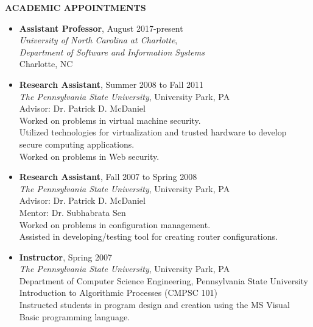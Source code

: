 \documentclass[10pt]{article}
\begin{document}
\vspace{1em} {\Large \textbf{ACADEMIC APPOINTMENTS}}
\begin{itemize}
\item \textbf{Assistant Professor}, August 2017-present\\
  \textit{University of North Carolina at Charlotte},\\
  \textit{Department of Software and Information Systems}\\
  Charlotte, NC\\

\item \textbf{Research Assistant}, Summer 2008 to Fall 2011\\
  \textit{The Pennsylvania State University},
  University Park, PA\\
  Advisor: Dr. Patrick D. McDaniel\\
  Worked on problems in virtual machine security.\\
  Utilized technologies for virtualization and trusted hardware to develop secure computing applications.\\
  Worked on problems in Web security.

\item \textbf{Research Assistant}, Fall 2007 to Spring 2008\\
  \textit{The Pennsylvania State University},
  University Park, PA\\
  Advisor: Dr. Patrick D. McDaniel\\
  Mentor: Dr. Subhabrata Sen\\
  Worked on problems in configuration management.\\
  Assisted in developing/testing tool for creating router configurations.

\item \textbf{Instructor}, Spring 2007\\
  \textit{The Pennsylvania State University},
  University Park, PA\\
  Department of Computer Science Engineering, Pennsylvania State University\\
  Introduction to Algorithmic Processes (CMPSC 101)\\
  Instructed students in program design and creation using the MS Visual Basic programming language.
\end{itemize}
\end{document}
